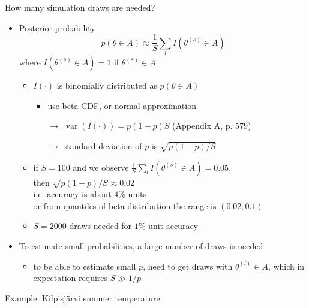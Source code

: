 \documentclass[finnish,english,t]{beamer}
\DeclareMathOperator{\var}{var}
\begin{document}
\begin{frame}{How many simulation draws are needed?}

  \begin{itemize}
  \item Posterior probability
    \begin{equation*}
      p(\theta \in A)\approx \frac{1}{S}\sum_l I(\theta^{(s)} \in A)
    \end{equation*}
    where $I(\theta^{(s)} \in A)=1$ if $\theta^{(s)} \in A$
    \begin{itemize}
    \item $I(\cdot)$ is binomially distributed as $p(\theta \in A)$
        \begin{itemize}
        \item use beta CDF, or normal approximation
        \item[$\rightarrow$] $\var(I(\cdot)) =  p(1-p)S$  (Appendix A, p. 579)
        \item[$\rightarrow$] standard deviation of $p$ is $\sqrt{p(1-p)/S}$
        \end{itemize}
        \pause
      \item if $S=100$ and we observe $\frac{1}{S}\sum_l I(\theta^{(s)} \in A)=0.05$,\\ then $\sqrt{p(1-p)/S} \approx 0.02$\\
        i.e. accuracy is about $4\%$ units\\
        or from quantiles of beta distribution the range is $(0.02,0.1)$
        \pause
      \item $S=2000$ draws needed for $1\%$ unit accuracy
    \end{itemize}
    \pause
  \item To  estimate small probabilities, a large number of draws is needed
    \begin{itemize}
    \item to be able to estimate small $p$, need to get draws with
      $\theta^{(l)} \in A$, which in expectation requires $S \gg 1/p$
    \end{itemize}
\end{itemize}

\end{frame}

\begin{frame}{Example: Kilpisjärvi summer temperature}

  \begin{center}
  \end{center}

\end{frame}
\end{document}
